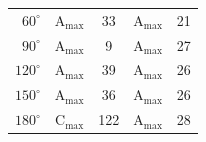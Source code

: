 \begin{minipage}{\textwidth}
\begin{minipage}[b]{0.4\textwidth}
\begin{tabular}{|r|cc|cc|}
			$ 60^\circ $ 		&      A$_{\max}$     		&     33   &    A$_{\max}$   &  21 \\ 
			$ 90^\circ $ 		&      A$_{\max}$     		&     9    &    A$_{\max}$   &  27 \\ 
			$ 120^\circ $ 		&      A$_{\max}$     		&     39   &    A$_{\max}$   &  26 \\ 
			$ 150^\circ $ 		&      A$_{\max}$     		&     36   &    A$_{\max}$   &  26 \\
			$ 180^\circ $ 		&      C$_{\max}$     		&     122  &    A$_{\max}$   &  28 \\ \hline
		\end{tabular}
		\vspace{2mm}
		\label{tab:elip1max}
		\egroup
	\end{minipage}
	\hfill
\end{minipage}

